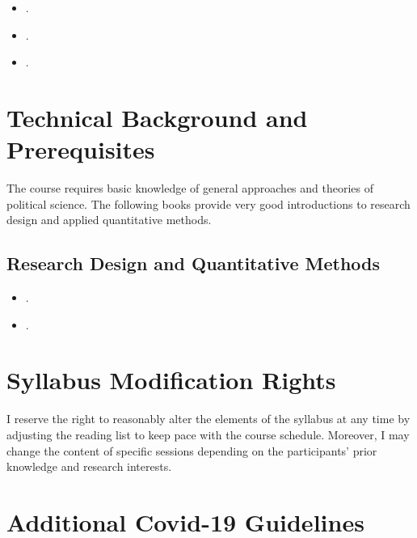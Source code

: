 \documentclass[abstract=on,parskip=full,headings=standardclasses,fontsize=11pt,paper=a4]{scrartcl}
\begin{document}
\begin{itemize}
\item {}.
\item {}.
\item {}.
\end{itemize}




\section*{Technical Background and Prerequisites}

The course requires basic knowledge of general approaches and theories of political science. The following books provide very good introductions to research design and applied quantitative methods.

\subsection*{Research Design and Quantitative Methods}
\begin{itemize}
\item {}.
\item {}. %
\end{itemize}


\section*{Syllabus Modification Rights}

I reserve the right to reasonably alter the elements of the syllabus at any time by adjusting the reading list to keep pace with the course schedule. Moreover, I may change the content of specific sessions depending on the participants' prior knowledge and research interests.


\section*{Additional Covid-19 Guidelines}
\end{document}
